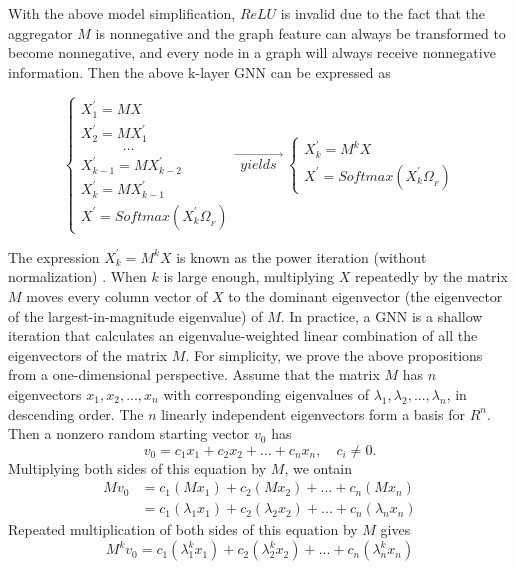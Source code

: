 \documentclass[preprint,11pt]{elsarticle}
\begin{document}
With the above model simplification, $ReLU$ is invalid due to the fact that the aggregator $M$ is nonnegative and the graph feature can always be transformed to become nonnegative, and every node in a graph will always receive nonnegative information. Then the above k-layer GNN can be expressed as
\begin{small}
\begin{equation}
\left\{ 
\begin{array}{l}
X_{1}^{'} = MX\\ 
X_{2}^{'} = MX_{1}^{'} \\ 
                  \quad  \quad \quad ... \\
X_{k-1}^{'} = MX_{k-2}^{'} \\
X_{k}^{'} = MX_{k-1}^{'} \\
X^{'} = Softmax(X_{k}^{'} \Omega_{_F})
\end{array}
\right.
\overrightarrow{\ \ yields\ \ } \ 
\left\{ 
\begin{array}{l}
X_{k}^{'} = M^{k}X \\ 
X^{'} = Softmax(X_{k}^{'} \Omega_{_F})
\end{array}
\right.
\end{equation}
\end{small}

The expression $X_{k}^{'} = M^{k}X$ is known as the power iteration (without normalization) \cite{ref1}. When $k$ is large enough, multiplying $X$ repeatedly by the matrix $M$ moves every column vector of $X$ to the dominant eigenvector (the eigenvector of the largest-in-magnitude eigenvalue) of $M$. In practice, a GNN is a shallow iteration that calculates an eigenvalue-weighted linear combination of all the eigenvectors of the matrix $M$. For simplicity, we prove the above propositions from a one-dimensional perspective. Assume that the matrix $M$ has $n$ eigenvectors $x_1, x_2, ..., x_n$ with corresponding eigenvalues of $\lambda_1, \lambda_2, ..., \lambda_n$,  in descending order. The $n$ linearly independent eigenvectors form a basis for $R^n$. Then a nonzero random starting vector $v_0$ has
\begin{equation}
	v_0 = c_1 x_1 +c_2 x_2+...+c_n x_n, \quad c_i \ne 0.
\end{equation}
Multiplying both sides of this equation by $M$, we ontain
\begin{equation}
\begin{split}
	M v_0 &= c_1 (Mx_1) +c_2 (Mx_2)+...+c_n (Mx_n)\\
	&= c_1 (\lambda_1 x_1) +c_2 (\lambda_2 x_2)+...+c_n (\lambda_n x_n)
\end{split}
\end{equation}
Repeated multiplication of both sides of this equation by $M$ gives
\begin{equation}
M^k v_0= c_1 (\lambda^k_1 x_1) +c_2 (\lambda^k_2 x_2)+...+c_n (\lambda^k_n x_n)
\end{equation}
\end{document}
